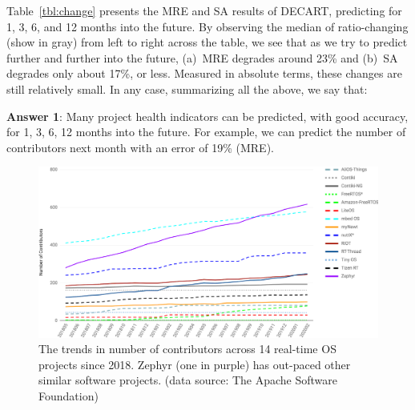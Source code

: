\documentclass[smallextended]{svjour3}
\newcommand{\BLUE}{\color{blue}}
\begin{document}
  
  
  
  
  Table~\ref{tbl:change} presents the MRE and SA results of DECART, predicting for 1, 3, 6, and 12 months into the future.
  By observing the median of ratio-changing (show in gray) from left to right across the table, we see that as we try to predict further and further into the future, (a)~MRE degrades around 23\% and (b)~SA degrades only about 17\%, or less.
 Measured in absolute terms, these changes are still relatively small. 
In any case, summarizing all the above, we say that: 
  
  
\begin{blockquote}
\noindent
\textbf{Answer 1}: Many project health indicators can be predicted, with good accuracy, for 1, 3, 6, 12   months into the future. For example, we can predict 
the number of contributors next month with an error of 19\% (MRE).
\end{blockquote}

\BLUE

\begin{figure}[!b]
\begin{center}
\includegraphics[width=4.5in]{apache.png}
\end{center}
 \caption{The trends in number of contributors across 14 real-time OS projects since 2018. Zephyr (one in purple) has 
  out-paced other similar software projects. (data source: The Apache Software Foundation)}\label{fig:apache}
 \end{figure} 
 
 
\end{document}

